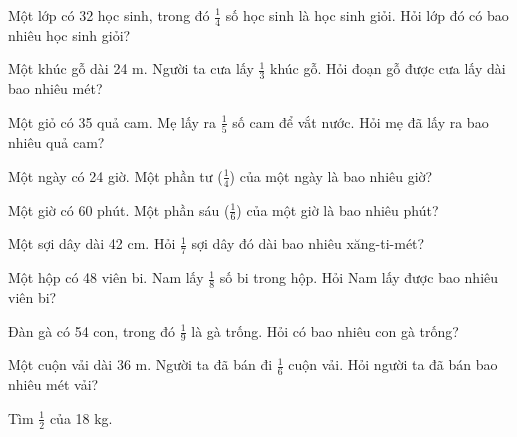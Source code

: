\begin{ex}
Một lớp có 32 học sinh, trong đó $\frac{1}{4}$ số học sinh là học sinh giỏi. Hỏi lớp đó có bao nhiêu học sinh giỏi?
\end{ex}

\begin{ex}
Một khúc gỗ dài 24 m. Người ta cưa lấy $\frac{1}{3}$ khúc gỗ. Hỏi đoạn gỗ được cưa lấy dài bao nhiêu mét?
\end{ex}

\begin{ex}
Một giỏ có 35 quả cam. Mẹ lấy ra $\frac{1}{5}$ số cam để vắt nước. Hỏi mẹ đã lấy ra bao nhiêu quả cam?
\end{ex}

\begin{ex}
Một ngày có 24 giờ. Một phần tư ($\frac{1}{4}$) của một ngày là bao nhiêu giờ?
\end{ex}

\begin{ex}
Một giờ có 60 phút. Một phần sáu ($\frac{1}{6}$) của một giờ là bao nhiêu phút?
\end{ex}

\begin{ex}
Một sợi dây dài 42 cm. Hỏi $\frac{1}{7}$ sợi dây đó dài bao nhiêu xăng-ti-mét?
\end{ex}

\begin{ex}
Một hộp có 48 viên bi. Nam lấy $\frac{1}{8}$ số bi trong hộp. Hỏi Nam lấy được bao nhiêu viên bi?
\end{ex}

\begin{ex}
Đàn gà có 54 con, trong đó $\frac{1}{9}$ là gà trống. Hỏi có bao nhiêu con gà trống?
\end{ex}

\begin{ex}
Một cuộn vải dài 36 m. Người ta đã bán đi $\frac{1}{6}$ cuộn vải. Hỏi người ta đã bán bao nhiêu mét vải?
\end{ex}

\begin{ex}
Tìm $\frac{1}{2}$ của 18 kg.
\end{ex}

